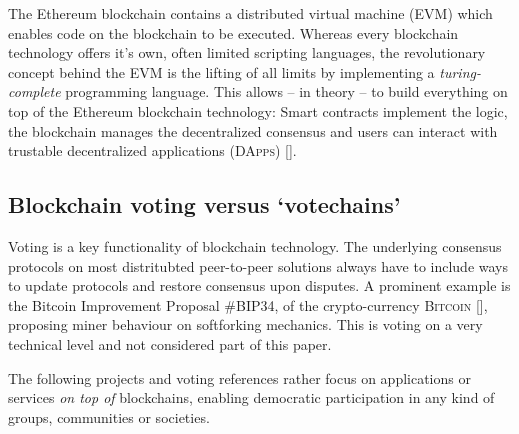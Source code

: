 The Ethereum blockchain contains a distributed virtual machine (\textsc{EVM}) which enables code on the blockchain to be executed. Whereas every blockchain technology offers it's own, often limited scripting languages, the revolutionary concept behind the EVM is the lifting of all limits by implementing a \textit{turing-complete} programming language. This allows -- in theory -- to build everything on top of the Ethereum blockchain technology: Smart contracts implement the logic, the blockchain manages the decentralized consensus and users can interact with trustable decentralized applications (\textsc{DApps}) [\cite{EPIE2015}].

\subsection{Blockchain voting versus \enquote*{votechains}}
Voting is a key functionality of blockchain technology. The underlying consensus protocols on most distritubted peer-to-peer solutions always have to include ways to update protocols and restore consensus upon disputes. A prominent example is the Bitcoin Improvement Proposal \#BIP34, of the crypto-currency \textsc{Bitcoin} [\cite{NAKAMOTO2008}], proposing miner behaviour on softforking mechanics. This is voting on a very technical level and not considered part of this paper.\par
The following projects and voting references rather focus on applications or services \textit{on top of} blockchains, enabling democratic participation in any kind of groups, communities or societies.

